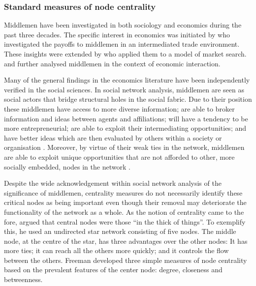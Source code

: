\subsubsection{Standard measures of node centrality}

Middlemen have been investigated in both sociology and economics during the past three decades. The specific interest in economics was initiated by \citet{KalaiMiddlemen1978} who investigated the payoffs to middlemen in an intermediated trade environment. These insights were extended by \citet{RubinsteinWolinsky1987} who applied them to a model of market search. \citet{JacksonWolinsky1996} and \citet{GillesChakrabarti2006} further analysed middlemen in the context of economic interaction.

Many of the general findings in the economics literature have been independently verified in the social sciences. In social network analysis, middlemen are seen as social actors that bridge structural holes in the social fabric. Due to their position these middlemen have access to more diverse information; are able to broker information and ideas between agents and affiliations; will have a tendency to be more entrepreneurial; are able to exploit their intermediating opportunities; and have better ideas which are then evaluated by others within a society or organisation \citep{Burt1992, Burt2004,Burt2005,Burt2010}. Moreover, by virtue of their weak ties in the network, middlemen are able to exploit unique opportunities that are not afforded to other, more socially embedded, nodes in the network \citep{Granovetter1973, Granovetter2005}.

Despite the wide acknowledgement within social network analysis of the significance of middlemen, centrality measures do not necessarily identify these critical nodes as being important even though their removal may deteriorate the functionality of the network as a whole. As the notion of centrality came to the fore, \citet[p.~219]{Freeman1979} argued that central nodes were those ``in the thick of things''. To exemplify this, he used an undirected star network consisting of five nodes. The middle node, at the centre of the star, has three advantages over the other nodes: It has more ties; it can reach all the others more quickly; and it controls the flow between the others. Freeman developed three simple measures of node centrality based on the prevalent features of the center node: degree, closeness and betweenness.

